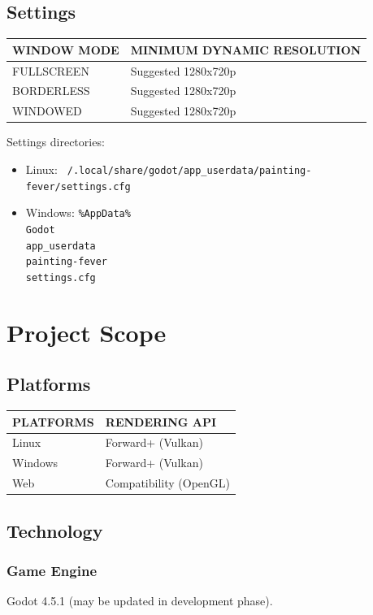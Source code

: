 \documentclass[11pt,a4paper]{report}
\begin{document}
\section{Settings}
\begin{center}
\begin{tabular}{ll}
WINDOW MODE & MINIMUM DYNAMIC RESOLUTION \\\hline
FULLSCREEN & Suggested 1280x720p \\
BORDERLESS & Suggested 1280x720p \\
WINDOWED & Suggested 1280x720p \\
\end{tabular}
\end{center}

\noindent Settings directories:
\begin{itemize}
  \item Linux: \texttt{~/.local/share/godot/app\_userdata/painting-fever/settings.cfg}
  \item Windows: \texttt{\%AppData\%\\Godot\\app\_userdata\\painting-fever\\settings.cfg}
\end{itemize}

\chapter{Project Scope}
\section{Platforms}
\begin{center}
\begin{tabular}{ll}
PLATFORMS & RENDERING API \\\hline
Linux & Forward+ (Vulkan) \\
Windows & Forward+ (Vulkan) \\
Web & Compatibility (OpenGL) \\
\end{tabular}
\end{center}

\section{Technology}
\subsection{Game Engine}
Godot 4.5.1 (may be updated in development phase).
\end{document}
